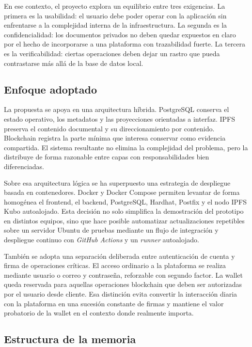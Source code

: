 \documentclass[11pt, a4paper]{article}
\begin{document}
En ese contexto, el proyecto explora un equilibrio entre tres exigencias. La primera es la usabilidad: el usuario debe poder operar con la aplicación sin enfrentarse a la complejidad interna de la infraestructura. La segunda es la confidencialidad: los documentos privados no deben quedar expuestos en claro por el hecho de incorporarse a una plataforma con trazabilidad fuerte. La tercera es la verificabilidad: ciertas operaciones deben dejar un rastro que pueda contrastarse más allá de la base de datos local.

\subsection{Enfoque adoptado}

La propuesta se apoya en una arquitectura híbrida. PostgreSQL conserva el estado operativo, los metadatos y las proyecciones orientadas a interfaz. IPFS preserva el contenido documental y su direccionamiento por contenido. Blockchain registra la parte mínima que interesa conservar como evidencia compartida. El sistema resultante no elimina la complejidad del problema, pero la distribuye de forma razonable entre capas con responsabilidades bien diferenciadas.

Sobre esa arquitectura lógica se ha superpuesto una estrategia de despliegue basada en contenedores. Docker y Docker Compose permiten levantar de forma homogénea el frontend, el backend, PostgreSQL, Hardhat, Postfix y el nodo IPFS Kubo autoalojado. Esta decisión no solo simplifica la demostración del prototipo en distintos equipos, sino que hace posible automatizar actualizaciones repetibles sobre un servidor Ubuntu de pruebas mediante un flujo de integración y despliegue continuo con \textit{GitHub Actions} y un \textit{runner} autoalojado.

También se adopta una separación deliberada entre autenticación de cuenta y firma de operaciones críticas. El acceso ordinario a la plataforma se realiza mediante usuario o correo y contraseña, reforzable con segundo factor. La wallet queda reservada para aquellas operaciones blockchain que deben ser autorizadas por el usuario desde cliente. Esa distinción evita convertir la interacción diaria con la plataforma en una sucesión constante de firmas y mantiene el valor probatorio de la wallet en el contexto donde realmente importa.

\subsection{Estructura de la memoria}
\end{document}
